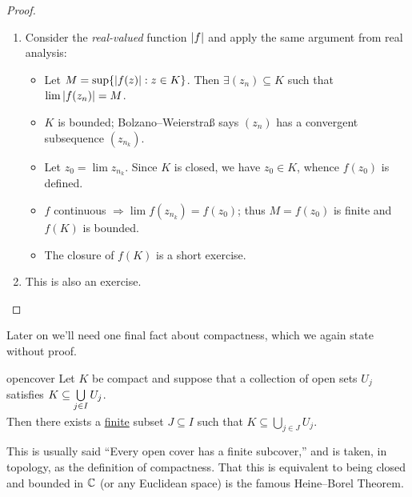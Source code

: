 \begin{proof}{}{}
	\begin{enumerate}
	  \item Consider the \emph{real-valued} function $\left| f\right|$ and apply the same argument from real analysis:
		\begin{itemize}
		  \item Let $M=\sup\{\left| f(z)\right|:z\in K\}$. Then $\exists (z_n)\subseteq K$ such that $\lim\left| f(z_n)\right| =M$.
		  \item $K$ is bounded; Bolzano--Weierstraß says $(z_n)$ has a convergent subsequence $(z_{n_k})$.
		  \item Let $z_0=\lim z_{n_k}$. Since $K$ is closed, we have $z_0\in K$, whence $f(z_0)$ is defined.
		  \item $f$ continuous $\Longrightarrow\lim f(z_{n_k})= f(z_0)$; thus $M=f(z_0)$ is finite and $f(K)$ is bounded.
		  \item The closure of $f(K)$ is a short exercise.
		\end{itemize}
		\item This is also an exercise.\qedhere %
	\end{enumerate}
\end{proof}

\goodbreak

Later on we'll need one final fact about compactness, which we again state without proof.

\begin{thm}{}{opencover}
	Let $K$ be compact and suppose that a collection of open sets $U_j$ satisfies $K\subseteq \smash[b]{\bigcup\limits_{j\in I} U_j}$.\par
	Then there exists a \underline{finite} subset $J\subseteq I$ such that $K\subseteq \bigcup\limits_{j\in J} U_j$.
\end{thm}

This is usually said ``Every open cover has a finite subcover,'' and is taken, in topology, as the definition of compactness. That this is equivalent to being closed and bounded in $\mathbb{C}$ (or any Euclidean space) is the famous Heine--Borel Theorem.


